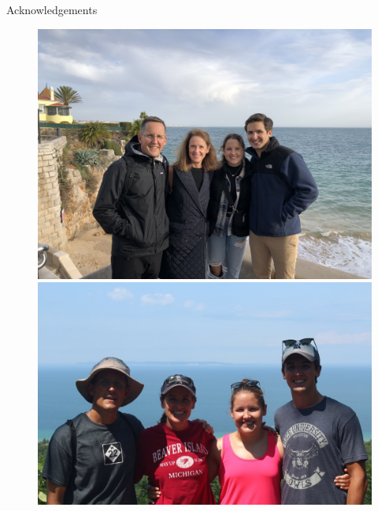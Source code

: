 \documentclass[]{beamer}
\begin{document}
\begin{frame}[noframenumbering]{Acknowledgements}
	\begin{figure}
		\begin{minipage}{0.49\linewidth}
			\centering
			\includegraphics[width=0.8\linewidth,trim={0em 20em 0em 70em},clip]{Images/ack/IMG_2073.JPG}

			\includegraphics[width=0.8\linewidth,trim={0em 0em 0em 20em},clip]{Images/ack/IMG_4210.jpg}


\end{minipage}
\end{figure}
\end{frame}
\end{document}
